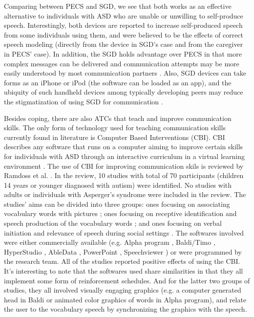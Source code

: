 Comparing between PECS and SGD, we see that both works as an effective alternative to individuals with ASD who are unable or unwilling to self-produce speech.  Interestingly, both devices are reported to increase self-produced speech from some individuals using them, and were believed to be the effects of correct speech modeling (directly from the device in SGD's case and from the caregiver in PECS' case).  In addition, the SGD holds advantage over PECS in that more complex messages can be delivered and communication attempts may be more easily understood by most communication partners \cite{mirenda2001autism}.  Also, SGD devices can take forms as an iPhone or iPod (the software can be loaded as an app), and the ubiquity of such handheld devices among typically developing peers may reduce the stigmatization of using SGD for communication \cite{kagohara2013using}.

Besides coping, there are also ATCs that teach and improve communication skills.  The only form of technology used for teaching communication skills currently found in literature is Computer Based Interventions (CBI).  CBI describes any software that runs on a computer aiming to improve certain skills for individuals with ASD through an interactive curriculum in a virtual learning environment \cite{lang2014assistive}.  The use of CBI for improving communication skils is reviewed by Ramdoss et al. \cite{ramdoss2011use}.  In the review, 10 studies with total of 70 participants (children 14 years or younger diagnosed with autism) were identified.  No studies with adults or individuals with Asperger's syndrome were included in the review.  The studies' aims can be divided into three groups: ones focusing on associating vocabulary words with pictures \cite{moore2000brief, hetzroni2005logos}; ones focusing on receptive identification and speech production of the vocabulary words \cite{heimann1995increasing, bernard1999enhancing, bosseler2003development, coleman2005using, massaro2006read}; and ones focusing on verbal initiation and relevance of speech during social settings \cite{parsons1993effect, simpson2004embedded, hetzroni2004effects}.  The softwares involved were either commercially available (e.g. Alpha program \cite{abledata2010alpha}, Baldi/Timo \cite{2005team}, HyperStudio \cite{mackiev2010welcome}, AbleData \cite{abledata2010alpha}, PowerPoint \cite{1997microsoft}, Speechviewer \cite{synapse2010the}) or were programmed by the research team.  All of the studies reported positive effects of using the CBI.  It's interesting to note that the softwares used share similarities in that they all implement some form of reinforcement schedules.  And for the latter two groups of studies, they all involved visually engaging graphics (e.g. a computer generated head in Baldi or animated color graphics of words in Alpha program), and relate the user to the vocabulary speech by synchronizing the graphics with the speech.


